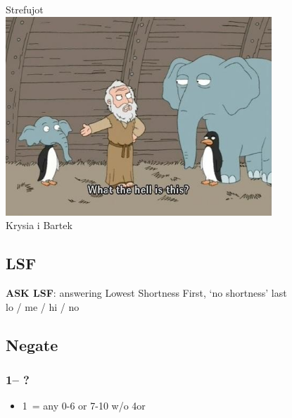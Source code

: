 \documentclass[12pt, a4paper]{report}
\renewcommand{\lsf}{{\color{BrickRed}\textbf{ASK LSF}}}
\begin{document}
\begin{titlepage}
    \centering
    \vspace*{2cm}
    {\Huge \clubs Strefujot \clubs\\}
    \vspace{1.5cm}
    \includegraphics[width=10cm]{../others/noe.jpg}\\
    \vspace{1cm}
    {\Large Krysia i Bartek\\}
\end{titlepage}

\begin{bidpage}
\section{LSF}

\lsf: answering Lowest Shortness First, `no shortness' last\\
lo / me / hi / no
\end{bidpage}

\begin{bidpage}
\section{Negate}

\subsubsection*{1\clubs -- ?}
\begin{itemize}
    \item 1\diams\ = any 0-6 or 7-10 w/o 4\major or \diams\ \gf
\end{itemize}
\end{bidpage}
\end{document}
